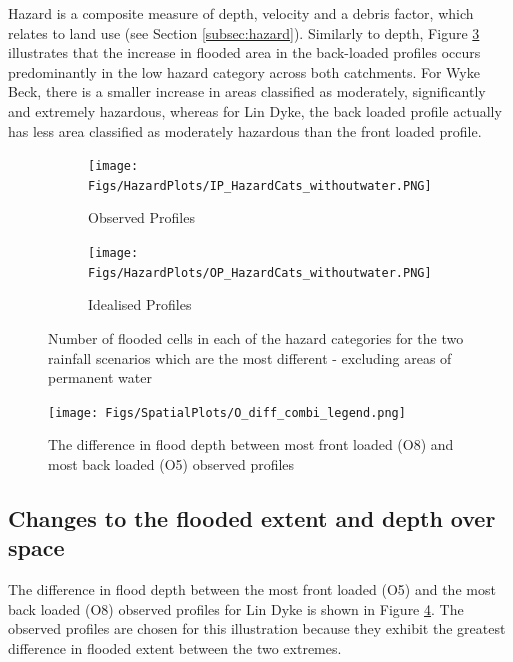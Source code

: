 \documentclass[APA,Times2COL]{WileyNJDv5}
\begin{document}

Hazard is a composite measure of depth, velocity and a debris factor, which relates to land use (see Section \ref{subsec:hazard}). Similarly to depth, Figure \ref{fig:hazard_plots} illustrates that the increase in flooded area in the back-loaded profiles occurs predominantly in the low hazard category across both catchments. For Wyke Beck, there is a smaller increase in areas classified as moderately, significantly and extremely hazardous, whereas for Lin Dyke, the back loaded profile actually has less area classified as moderately hazardous than the front loaded profile.   

\begin{figure}[h!]
\centering
\begin{subfigure}[H]{\linewidth}
   \centering
    \texttt{[image: Figs/HazardPlots/IP\_HazardCats\_withoutwater.PNG]}
   \caption{Observed Profiles}
   \label{fig:hazardcats}
\end{subfigure}
\begin{subfigure}{\linewidth}
   \centering
    \texttt{[image: Figs/HazardPlots/OP\_HazardCats\_withoutwater.PNG]}
   \caption{Idealised Profiles}
   \label{fig:hazardcats_withoutwater}
\end{subfigure}
\centering
 \caption{Number of flooded cells in each of the hazard categories for the two rainfall scenarios which are the most different - excluding areas of permanent water}\label{fig:hazard_plots} 
\end{figure}


\begin{figure}[h!]
    \centering
 \texttt{[image: Figs/SpatialPlots/O\_diff\_combi\_legend.png]}    
 \vspace{-25pt}
   \caption{The difference in flood depth between most front loaded (O8) and most back loaded (O5) observed profiles}\label{fig:flooded_area_spatial_diff} 
\end{figure}

\subsection{Changes to the flooded extent and depth over space}\label{subsec:model}
The difference in flood depth between the most front loaded (O5) and the most back loaded (O8) observed profiles for Lin Dyke is shown in Figure \ref{fig:flooded_area_spatial_diff}. The observed profiles are chosen for this illustration because they exhibit the greatest difference in flooded extent between the two extremes. 
\end{document}
